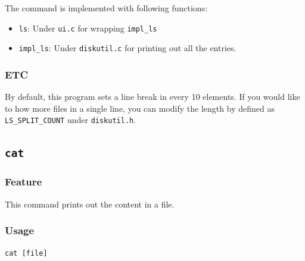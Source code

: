 \documentclass{homework}
\begin{document}
The command is implemented with following functions:
\begin{itemize}
    \item \texttt{ls}: Under \texttt{ui.c} for wrapping \texttt{impl_ls}
    \item \texttt{impl_ls}: Under \texttt{diskutil.c} for printing out all the entries.
\end{itemize}

\subsubsection{ETC}
By default, this program sets a line break in every 10 elements. If you would like to how more files in a single line, you can modify the length by defined as \texttt{LS_SPLIT_COUNT} under \texttt{diskutil.h}.
\pagebreak

\subsection{\texttt{cat}}
\subsubsection{Feature}
This command prints out the content in a file. 
\subsubsection{Usage}
\begin{center}
\texttt{cat [file]}
\end{center}
\end{document}
